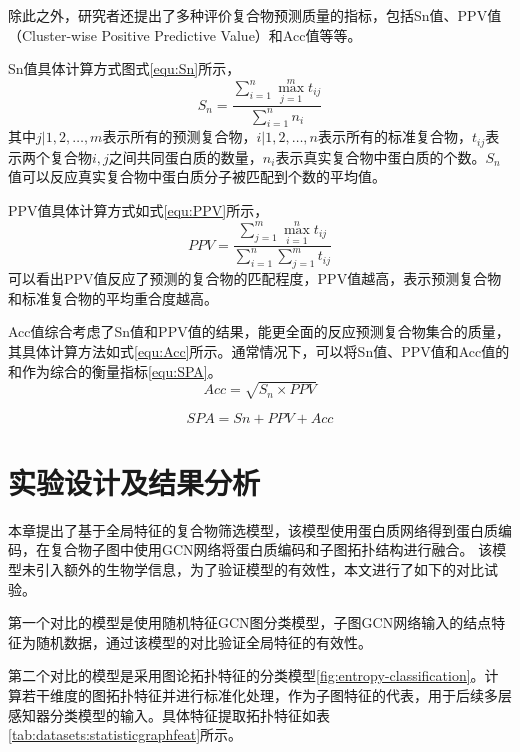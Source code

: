 除此之外，研究者还提出了多种评价复合物预测质量的指标\cite{shi_protein_2011}，包括Sn值、PPV值（Cluster-wise Positive Predictive Value）和Acc值等等。

Sn值具体计算方式图式\ref{equ:Sn}所示，
\begin{equation}
    \label{equ:Sn}
    S_n=\frac{\sum_{i = 1}^{n} \max_{j=1}^{m} t_{ij}}{\sum_{i = 1}^{n}n_i}
\end{equation}
其中${j| 1,2,\dots,m }$表示所有的预测复合物，${i| 1,2,\dots,n }$表示所有的标准复合物，$t_{ij}$表示两个复合物$i,j$之间共同蛋白质的数量，$n_i$表示真实复合物中蛋白质的个数。$S_n$值可以反应真实复合物中蛋白质分子被匹配到个数的平均值。

PPV值具体计算方式如式\ref{equ:PPV}所示，
\begin{equation}
    \label{equ:PPV}
    PPV=\frac{\sum_{j = 1}^{m} \max_{i=1}^{n} t_{ij}}{\sum_{i = 1}^{n} \sum_{j = 1}^{m}   t_{ij}}
\end{equation}
可以看出PPV值反应了预测的复合物的匹配程度，PPV值越高，表示预测复合物和标准复合物的平均重合度越高。

Acc值综合考虑了Sn值和PPV值的结果，能更全面的反应预测复合物集合的质量，其具体计算方法如式\ref{equ:Acc}所示。通常情况下，可以将Sn值、PPV值和Acc值的和作为综合的衡量指标\ref{equ:SPA}。
\begin{equation}
    \label{equ:Acc}
    Acc=\sqrt{S_n\times PPV}
\end{equation}

\begin{equation}
    \label{equ:SPA}
    SPA= Sn+PPV+Acc
\end{equation}

\section{实验设计及结果分析}
\label{section:NodeConv:experience}

本章提出了基于全局特征的复合物筛选模型，该模型使用蛋白质网络得到蛋白质编码，在复合物子图中使用GCN网络将蛋白质编码和子图拓扑结构进行融合。
该模型未引入额外的生物学信息，为了验证模型的有效性，本文进行了如下的对比试验。

第一个对比的模型是使用随机特征GCN图分类模型，子图GCN网络输入的结点特征为随机数据，通过该模型的对比验证全局特征的有效性。

第二个对比的模型是采用图论拓扑特征的分类模型\ref{fig:entropy-classification}。计算若干维度的图拓扑特征并进行标准化处理，作为子图特征的代表，用于后续多层感知器分类模型的输入。具体特征提取拓扑特征如表\ref{tab:datasets:statisticgraphfeat}所示。


